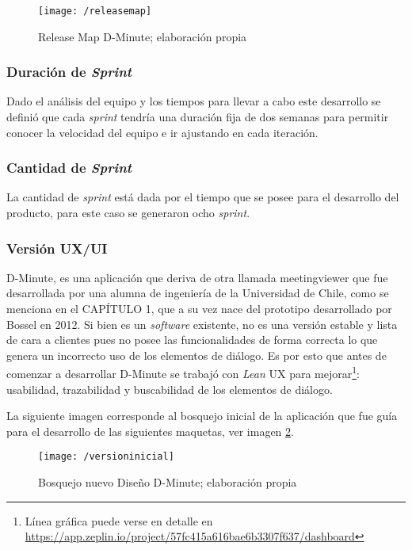 \begin{figure}[!h]
\centering
\texttt{[image: /releasemap]}
\caption{Release Map D-Minute; elaboración propia} 
\label{img4-5}
\end{figure}

\subsubsection{Duración de \textit{Sprint}}

Dado el análisis del equipo y los tiempos para llevar a cabo este desarrollo se definió que cada \textit{sprint} tendría una duración fija de dos semanas para permitir conocer la velocidad del equipo e ir ajustando en cada iteración. 	

\subsubsection{Cantidad de \textit{Sprint}}

La cantidad de \textit{sprint} está dada por el tiempo que se posee para el desarrollo del producto, para este caso se generaron ocho \textit{sprint}.

\subsubsection{Versión UX/UI}

D-Minute, es una aplicación que deriva de otra llamada meetingviewer que fue desarrollada por una alumna de ingeniería de la Universidad de Chile, como se menciona en el CAPÍTULO 1, que a su vez nace del prototipo desarrollado por Bossel en 2012. Si bien es un \textit{software} existente, no es una versión estable y lista de cara a clientes pues no posee las funcionalidades de forma correcta lo que genera un incorrecto uso de los elementos de diálogo. Es por esto que antes de comenzar a desarrollar D-Minute se trabajó con \textit{Lean} UX para mejorar\footnote{Línea gráfica puede verse en detalle en \url{https://app.zeplin.io/project/57fc415a616bae6b3307f637/dashboard}}: usabilidad, trazabilidad y buscabilidad de los elementos de diálogo.

La siguiente imagen corresponde al bosquejo inicial de la aplicación que fue guía para el desarrollo de las siguientes maquetas, ver imagen \ref{img4-6}.

\begin{figure}[!h]
\centering
\texttt{[image: /versioninicial]}
\caption{Bosquejo nuevo Diseño D-Minute; elaboración propia} 
\label{img4-6}
\end{figure}

